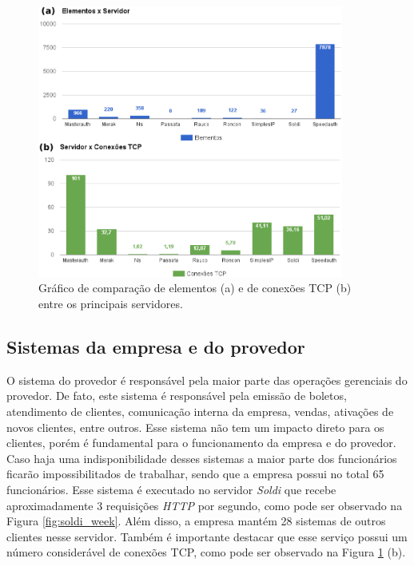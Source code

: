 \begin{figure}[h!]
 \centering
 \includegraphics[width=380px]{img/elementos_tcp.eps}
 \caption{Gráfico de comparação de elementos (a) e de conexões TCP (b) entre os principais servidores.}
 \label{fig:elementos_tcp}
\end{figure}

\subsection{Sistemas da empresa e do provedor}
\label{section:sistemas}

O sistema do provedor é responsável pela maior parte das operações gerenciais do provedor. De fato, este sistema é responsável pela emissão de 
boletos, atendimento de clientes, comunicação interna da empresa, vendas, ativações de novos clientes, entre outros. Esse sistema não tem um 
impacto direto para os clientes, porém é fundamental para o funcionamento da empresa e do provedor. Caso haja uma indisponibilidade desses sistemas 
a maior parte dos funcionários ficarão impossibilitados de trabalhar, sendo que a empresa possui no total 65 funcionários.
Esse sistema é executado no servidor \textit{Soldi} que recebe aproximadamente 3 requisições \textit{HTTP} \cite{tanenbaum2011} por segundo, como 
pode ser observado na Figura \ref{fig:soldi_week}. Além disso, a empresa mantém 28 sistemas de outros clientes nesse servidor. 
Também é importante destacar que esse serviço possui um número considerável de conexões \ac{TCP}, como pode ser observado na Figura 
\ref{fig:elementos_tcp} (b).

